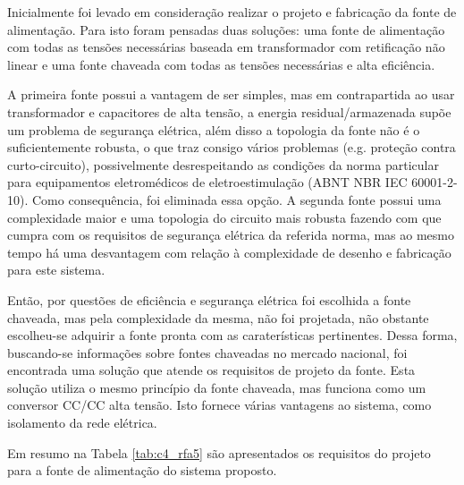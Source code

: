Inicialmente foi levado em consideração realizar o projeto e fabricação da fonte de alimentação. Para isto foram pensadas duas soluções: uma fonte de alimentação com todas as tensões necessárias baseada em transformador com retificação não linear e uma fonte chaveada com todas as tensões necessárias e alta eficiência.

A primeira fonte possui a vantagem de ser simples, mas em contrapartida ao usar transformador e capacitores de alta tensão, a energia residual/armazenada supõe um problema de segurança elétrica, além disso a topologia da fonte não é o suficientemente robusta, o que traz consigo vários problemas (e.g. proteção contra curto-circuito), possivelmente desrespeitando as condições da norma particular para equipamentos eletromédicos de eletroestimulação (\acrshort{ABNT} \acrshort{NBR} \acrshort{IEC} 60001-2-10). Como consequência, foi eliminada essa opção. A segunda fonte possui uma complexidade maior e uma topologia do circuito mais robusta fazendo com que cumpra com os requisitos de segurança elétrica da referida norma, mas ao mesmo tempo há uma desvantagem com relação à complexidade de desenho e fabricação para este sistema.

Então, por questões de eficiência e segurança elétrica foi escolhida a fonte chaveada, mas pela complexidade da mesma, não foi projetada, não obstante escolheu-se adquirir a fonte pronta com as caraterísticas pertinentes. Dessa forma, buscando-se informações sobre fontes chaveadas no mercado nacional, foi encontrada uma solução que atende os requisitos de projeto da fonte. Esta solução utiliza o mesmo princípio da fonte chaveada, mas funciona como um conversor CC/CC alta tensão. Isto fornece várias vantagens ao sistema, como isolamento da rede elétrica. 

Em resumo na Tabela \ref{tab:c4_rfa5} são apresentados os requisitos do projeto para a fonte de alimentação do sistema proposto. 

